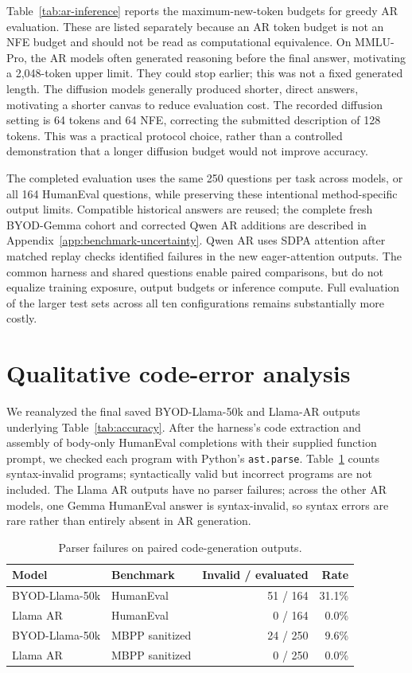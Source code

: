 \documentclass{article}
\begin{document}
Table~\ref{tab:ar-inference} reports the maximum-new-token budgets for greedy AR evaluation. These are listed separately because an AR token budget is not an NFE budget and should not be read as computational equivalence. On MMLU-Pro, the AR models often generated reasoning before the final answer, motivating a 2,048-token upper limit. They could stop earlier; this was not a fixed generated length. The diffusion models generally produced shorter, direct answers, motivating a shorter canvas to reduce evaluation cost. The recorded diffusion setting is 64 tokens and 64 NFE, correcting the submitted description of 128 tokens. This was a practical protocol choice, rather than a controlled demonstration that a longer diffusion budget would not improve accuracy.

The completed evaluation uses the same 250 questions per task across models, or all 164 HumanEval questions, while preserving these intentional method-specific output limits. Compatible historical answers are reused; the complete fresh BYOD-Gemma cohort and corrected Qwen AR additions are described in Appendix~\ref{app:benchmark-uncertainty}. Qwen AR uses SDPA attention after matched replay checks identified failures in the new eager-attention outputs. The common harness and shared questions enable paired comparisons, but do not equalize training exposure, output budgets or inference compute. Full evaluation of the larger test sets across all ten configurations remains substantially more costly.

\section{Qualitative code-error analysis}
\label{app:code-errors}

We reanalyzed the final saved BYOD-Llama-50k and Llama-AR outputs underlying Table~\ref{tab:accuracy}. After the harness's code extraction and assembly of body-only HumanEval completions with their supplied function prompt, we checked each program with Python's \texttt{ast.parse}. Table~\ref{tab:syntax-errors} counts syntax-invalid programs; syntactically valid but incorrect programs are not included. The Llama AR outputs have no parser failures; across the other AR models, one Gemma HumanEval answer is syntax-invalid, so syntax errors are rare rather than entirely absent in AR generation.

\begin{table}[h]
\caption{Parser failures on paired code-generation outputs.}
\label{tab:syntax-errors}
\centering
\small
\begin{tabular}{llrr}
\toprule
Model & Benchmark & Invalid / evaluated & Rate \\
\midrule
BYOD-Llama-50k & HumanEval & 51 / 164 & 31.1\% \\
Llama AR & HumanEval & 0 / 164 & 0.0\% \\
BYOD-Llama-50k & MBPP sanitized & 24 / 250 & 9.6\% \\
Llama AR & MBPP sanitized & 0 / 250 & 0.0\% \\
\bottomrule
\end{tabular}
\end{table}
\end{document}
